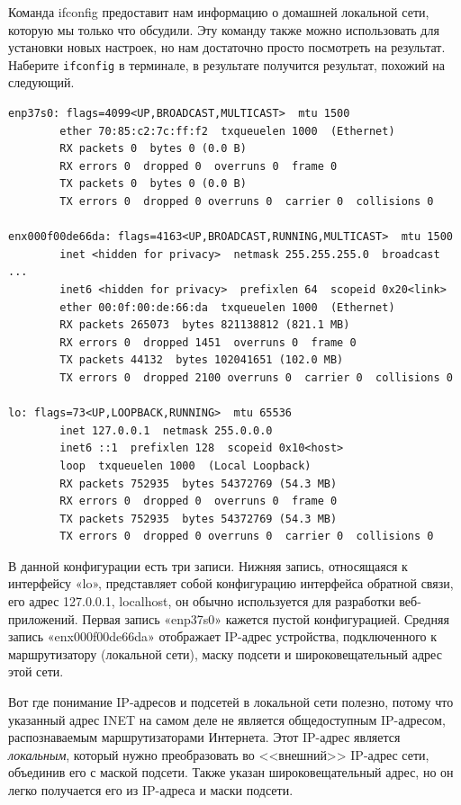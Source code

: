 \documentclass[12pt]{article}
\begin{document}
Команда ifconfig предоставит нам информацию о домашней локальной сети,
которую мы только что обсудили. Эту команду также можно использовать для
установки новых настроек, но нам достаточно просто посмотреть на
результат. Наберите \texttt{ifconfig} в терминале, в результате
получится результат, похожий на следующий.

\begin{verbatim}
enp37s0: flags=4099<UP,BROADCAST,MULTICAST>  mtu 1500
        ether 70:85:c2:7c:ff:f2  txqueuelen 1000  (Ethernet)
        RX packets 0  bytes 0 (0.0 B)
        RX errors 0  dropped 0  overruns 0  frame 0
        TX packets 0  bytes 0 (0.0 B)
        TX errors 0  dropped 0 overruns 0  carrier 0  collisions 0

enx000f00de66da: flags=4163<UP,BROADCAST,RUNNING,MULTICAST>  mtu 1500
        inet <hidden for privacy>  netmask 255.255.255.0  broadcast ...
        inet6 <hidden for privacy>  prefixlen 64  scopeid 0x20<link>
        ether 00:0f:00:de:66:da  txqueuelen 1000  (Ethernet)
        RX packets 265073  bytes 821138812 (821.1 MB)
        RX errors 0  dropped 1451  overruns 0  frame 0
        TX packets 44132  bytes 102041651 (102.0 MB)
        TX errors 0  dropped 2100 overruns 0  carrier 0  collisions 0

lo: flags=73<UP,LOOPBACK,RUNNING>  mtu 65536
        inet 127.0.0.1  netmask 255.0.0.0
        inet6 ::1  prefixlen 128  scopeid 0x10<host>
        loop  txqueuelen 1000  (Local Loopback)
        RX packets 752935  bytes 54372769 (54.3 MB)
        RX errors 0  dropped 0  overruns 0  frame 0
        TX packets 752935  bytes 54372769 (54.3 MB)
        TX errors 0  dropped 0 overruns 0  carrier 0  collisions 0
\end{verbatim}

В данной конфигурации есть три записи. Нижняя запись, относящаяся к
интерфейсу «lo», представляет собой конфигурацию интерфейса обратной
связи, его адрес 127.0.0.1, localhost, он обычно используется для
разработки веб-приложений. Первая запись «enp37s0» кажется пустой
конфигурацией. Средняя запись «enx000f00de66da» отображает IP-адрес
устройства, подключенного к маршрутизатору (локальной сети), маску
подсети и широковещательный адрес этой сети.

Вот где понимание IP-адресов и
подсетей в локальной сети полезно, потому что указанный адрес INET на
самом деле не является общедоступным IP-адресом, распознаваемым
маршрутизаторами Интернета. Этот IP-адрес является \emph{локальным},
который нужно преобразовать во <<внешний>> IP-адрес сети, объединив его с
маской подсети. Также указан широковещательный адрес, но он легко
получается его из IP-адреса и маски подсети.
\end{document}
